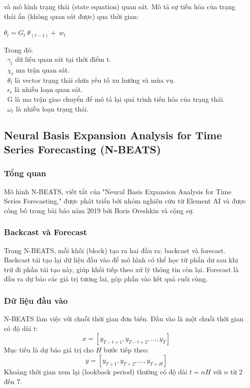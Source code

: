 \documentclass[conference]{IEEEtran}
\begin{document}
và mô hình trạng thái (state equation) quan sát. Mô tả sự tiến hóa của trạng thái ẩn (không quan sát được) qua thời gian:

\begin{center}

    \(\theta_t=G_t\ \theta_(t-1)+\ w_t\)

\end{center}

Trong đó:\\
\indent\textbullet\ \(\gamma_t\) dữ liệu quan sát tại thời điểm t.\\
\indent\textbullet\ \(\chi_t\) ma trận quan sát.\\
\indent\textbullet\ \(\theta_t\) là vector trạng thái chứa yếu tố xu hướng và mùa vụ.\\
\indent\textbullet\ \(\epsilon_t\) là nhiễu loạn quan sát.\\
\indent\textbullet\ G là ma trận giao chuyển để mô tả lại quá trình tiến hóa của trạng thái.\\
\indent\textbullet\ \(\omega_t\) là nhiễu loạn trạng thái.

\subsection{Neural Basis Expansion Analysis for Time Series Forecasting (N-BEATS)}
\vspace{1mm}
\subsubsection{Tổng quan}
Mô hình N-BEATS, viết tắt của "Neural Basis Expansion Analysis for Time Series Forecasting," được phát triển bởi nhóm nghiên cứu từ Element AI và được công bố trong bài báo năm 2019 bởi Boris Oreshkin và cộng sự.

\subsubsection{Backcast và Forecast}
Trong N-BEATS, mỗi khối (block) tạo ra hai đầu ra: backcast và forecast. Backcast tái tạo lại dữ liệu đầu vào để mô hình có thể học từ phần dư sau khi trừ đi phần tái tạo này, giúp khối tiếp theo xử lý thông tin còn lại. Forecast là đầu ra dự báo các giá trị tương lai, góp phần vào kết quả cuối cùng.

\subsubsection{Dữ liệu đầu vào}
N-BEATS làm việc với chuỗi thời gian đơn biến. Đầu vào là một chuỗi thời gian có độ dài $t$:
\[
    x = [y_{T-t+1}, y_{T-t+2}, \ldots, y_T]
\]
Mục tiêu là dự báo giá trị cho $H$ bước tiếp theo:
\[
    y = [y_{T+1}, y_{T+2}, \ldots, y_{T+H}]
\]
Khoảng thời gian xem lại (lookback period) thường có độ dài $t = nH$ với $n$ từ 2 đến 7.
\end{document}
